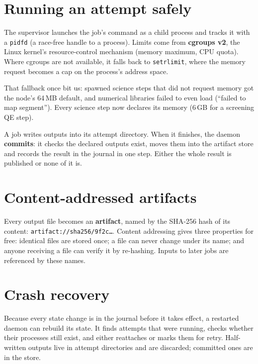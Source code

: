 \documentclass[11pt,a4paper]{report}
\newcommand{\code}[1]{\texttt{#1}}
\begin{document}
\section{Running an attempt safely}

The supervisor launches the job's command as a child process and tracks it with a
\code{pidfd} (a race-free handle to a process). Limits come from \textbf{cgroups v2}, the Linux
kernel's resource-control mechanism (memory maximum, CPU quota). Where cgroups are not
available, it falls back to \code{setrlimit}, where the memory request becomes a cap on the
process's address space.

\begin{keyidea}
That fallback once bit us: spawned science steps that did not request memory got the node's
64\,MB default, and numerical libraries failed to even load (``failed to map segment''). Every
science step now declares its memory (6\,GB for a screening QE step).
\end{keyidea}

A job writes outputs into its attempt directory. When it finishes, the daemon
\textbf{commits}: it checks the declared outputs exist, moves them into the artifact store and
records the result in the journal in one step. Either the whole result is published or none
of it is.

\section{Content-addressed artifacts}

Every output file becomes an \textbf{artifact}, named by the SHA-256 hash of its content:
\code{artifact://\allowbreak sha256/\allowbreak 9f2c\ldots}. Content addressing gives three properties for free:
identical files are stored once; a file can never change under its name; and anyone receiving
a file can verify it by re-hashing. Inputs to later jobs are referenced by these names.

\section{Crash recovery}

Because every state change is in the journal before it takes effect, a restarted daemon can
rebuild its state. It finds attempts that were running, checks whether their processes still
exist, and either reattaches or marks them for retry. Half-written outputs live in attempt
directories and are discarded; committed ones are in the store.
\end{document}
